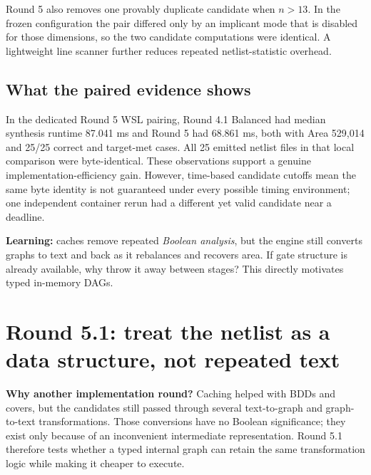 \documentclass[a4paper,10pt]{article}
\theoremstyle{definition}
\theoremstyle{remark}
\begin{document}
Round 5 also removes one provably duplicate candidate when $n>13$. In the frozen configuration the pair differed only by an implicant mode that is disabled for those dimensions, so the two candidate computations were identical. A lightweight line scanner further reduces repeated netlist-statistic overhead.

\subsection{What the paired evidence shows}
In the dedicated Round 5 WSL pairing, Round 4.1 Balanced had median synthesis runtime 87.041 ms and Round 5 had 68.861 ms, both with Area 529,014 and 25/25 correct and target-met cases. All 25 emitted netlist files in that local comparison were byte-identical. These observations support a genuine implementation-efficiency gain. However, time-based candidate cutoffs mean the same byte identity is not guaranteed under every possible timing environment; one independent container rerun had a different yet valid candidate near a deadline.

\begin{tcolorbox}[colback=ResearchMint!40,colframe=ResearchSage,title=Decision after Round 5]
\textbf{Learning:} caches remove repeated \emph{Boolean analysis}, but the engine still converts graphs to text and back as it rebalances and recovers area. If gate structure is already available, why throw it away between stages? This directly motivates typed in-memory DAGs.
\end{tcolorbox}

\section{Round 5.1: treat the netlist as a data structure, not repeated text}
\textbf{Why another implementation round?} Caching helped with BDDs and covers, but the candidates still passed through several text-to-graph and graph-to-text transformations. Those conversions have no Boolean significance; they exist only because of an inconvenient intermediate representation. Round 5.1 therefore tests whether a typed internal graph can retain the same transformation logic while making it cheaper to execute.
\end{document}
